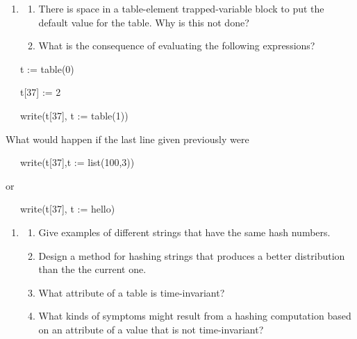 \liststyleLix
\begin{enumerate}
\item \begin{enumerate}

\item There is space in a table-element trapped-variable block to put
the default value for the table. Why is this not done?

\item 
What is the consequence of evaluating the following expressions?
\end{enumerate}
\end{enumerate}
{\ttfamily\mdseries
\ \ \ t := table(0)}

{\ttfamily\mdseries
\ \ \ t[37] := 2}

{\ttfamily\mdseries
\ \ \ write(t[37], t := table(1))}

What would happen if the last line given previously were

{\ttfamily\mdseries
\ \ \ write(t[37],t := list(100,3))}

or

{\ttfamily\mdseries
\ \ \ write(t[37], t := {\textquotedbl}hello{\textquotedbl})}

\liststyleLx
\begin{enumerate}
\item \begin{enumerate}

\item Give examples of different strings that have the same hash numbers.

\item Design a method for hashing strings that produces a better
distribution than the the current one.

\item What attribute of a table is time-invariant?

\item What kinds of symptoms might result from a hashing computation
 based on an attribute of a value that is not time-invariant?

\end{enumerate}
\end{enumerate}
